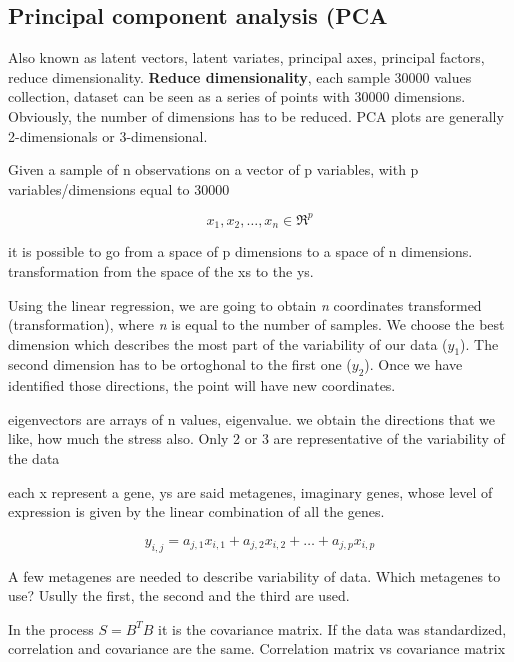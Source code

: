	\subsection{Principal component analysis (PCA}

	Also known as latent vectors, latent variates, principal axes, 
	principal factors, reduce dimensionality. \textbf{Reduce dimensionality}, each sample 30000 values collection, dataset can be seen as a series of points with 30000 dimensions. Obviously, the number of dimensions has to be reduced. PCA plots are generally 2-dimensionals or 3-dimensional.

	Given a sample of
	n observations on a vector of p variables, with p variables/dimensions equal to 30000

	\begin{equation}
	{x_1, x_2, \dots, x_n} \in  \Re^p
	\end{equation}

	it is possible to go from a space of p dimensions to a space of n dimensions. transformation from the space of the xs to the ys. 

	Using the linear regression, we are going to obtain \textit{n} coordinates transformed (transformation), where \textit{n} is equal to the number of samples. We choose the best dimension which describes the most part of the variability of our data ($ y_1 $). The second dimension has to be ortoghonal to the first one ($ y_2 $). Once we have identified those directions, the point will have new coordinates. 

	eigenvectors are arrays of n values, eigenvalue.
	we obtain the directions that we like, how much the stress also. Only 2 or 3 are representative of the variability of the data 

	each x represent a gene, ys are said metagenes, imaginary genes, whose level of expression is given by the linear combination of all the genes. 

	\begin{equation}
	y_{i,j} = a_{j,1}x_{i,1} + a_{j,2}x_{i,2} + \dots + a_{j,p}x_{i,p}
	\end{equation}

	A few metagenes are needed to describe variability of data. Which metagenes to use? Usully the first, the second and the third are used. 

	In the process $ S = B^T B $ it is the covariance matrix. If the data was standardized, correlation and covariance are the same. Correlation matrix vs covariance matrix %

